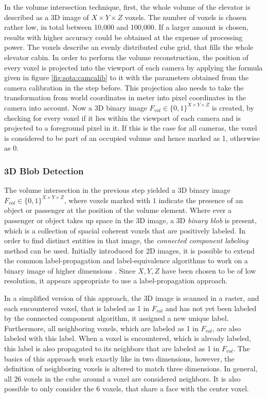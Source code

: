 In the volume intersection technique, first, the whole volume of the elevator is described as a \ac{3D} image of $ X \times Y \times Z $ voxels.
The number of voxels is chosen rather low, in total between 10,000 and 100,000.
If a larger amount is chosen, results with higher accuracy could be obtained at the expense of processing power.
The voxels describe an evenly distributed cube grid, that fills the whole elevator cabin.
In order to perform the volume reconstruction,
the position of every voxel is projected into the viewport of each camera by applying the formula given in figure \ref{fig:sota:camcalib} to it with the parameters obtained from the camera calibration in the step before. 
This projection also needs to take the transformation from world coordinates in meter into pixel coordinates in the camera into account.
Now a \ac{3D} binary image $ F_{vol} \in \{0, 1\}^{X \times Y \times Z} $ is created, by checking for every voxel if it lies within the viewport of each camera and is projected to a foreground pixel in it.
If this is the case for all cameras, the voxel is considered to be part of an occupied volume and hence marked as 1, otherwise as 0.

\subsubsection{3D Blob Detection}

The volume intersection in the previous step yielded a \ac{3D} binary image \\
$ F_{vol} \in \{0, 1\}^{X \times Y \times Z} $, where voxels marked with $ 1 $ indicate the presence of an object or passenger at the position of the volume element.
Where ever a passenger or object takes up space in the \ac{3D} image, a \ac{3D} \emph{binary blob} is present, which is a collection of spacial coherent voxels that are positively labeled.
In order to find distinct entities in that image, the \emph{connected component labeling} method can be used.
Initially introduced for \ac{2D} images, it is possible to extend 
the common label-propagation and label-equivalence algorithms to work on a binary image of higher dimensions
\autocite[][p.~39]{he2017connected}.
Since $ X, Y, Z $ have been chosen to be of low resolution, it appears appropriate to use a label-propagation approach.

In a simplified version of this approach, the \ac{3D} image is scanned in a raster, 
and each encountered voxel, that is labeled as 1 in $ F_{vol} $ and has not yet been labeled by the connected component algorithm, it assigned a new unique label.
Furthermore, all neighboring voxels, which are labeled as 1 in $ F_{vol} $, are also labeled with this label.
When a voxel is encountered, which is already labeled, this label is also propagated to its neighbors that are labeled as 1 in $ F_{vol} $. 
The basics of this approach work exactly like in two dimensions, however, the definition of neighboring voxels is altered to match three dimensions. 
In general, all 26 voxels in the cube around a voxel are considered neighbors.
It is also possible to only consider the 6 voxels, that share a face with the center voxel.

